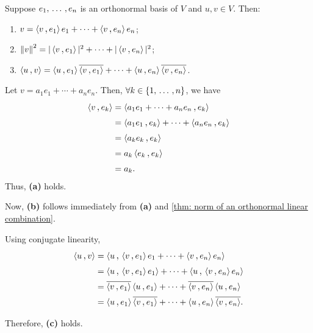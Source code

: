 \begin{thm}
  \label{thm: writing a vector as a linear combination of an orthonormal basis}

  Suppose $e_1, {\, \ldots \,\,}, e_n$ is an orthonormal basis of $V$ and $u,v \in V$. Then:
  \begin{enumerate}[label=\textbf{(\alph*)}]
    \item $v=\ip{v}{e_1}e_1 + \cdots + \ip{v}{e_n}e_n$;
    \item $\norm{v}^2 = |\ip{v}{e_1}|^2 + \cdots + |\ip{v}{e_n}|^2$;
    \item $\ip{u}{v} = \ip{u}{e_1} \overline{\ip{v}{e_1}} + \cdots + \ip{u}{e_n} \overline{\ip{v}{e_n}}$.
  \end{enumerate}
\end{thm}
\begin{prf}
  Let $v=a_1 e_1 + \cdots + a_n e_n$. Then, $\forall k \in \{1, {\, \ldots \,\,}, n\}$, we have
  \begin{equation}
    \begin{aligned}
      \ip{v}{e_k}
      &=\ip{a_1 e_1 + \cdots + a_n e_n}{e_k} \\
      &=\ip{a_1 e_1}{e_k} + \cdots + \ip{a_n e_n}{e_k}\\
      &=\ip{a_ke_k}{e_k} \\
      &= a_k\ip{e_k}{e_k} \\
      &=a_k.
    \end{aligned}
  \end{equation}
  Thus, \textbf{(a)} holds.

  Now, \textbf{(b)} follows immediately from \textbf{(a)} and \ref{thm: norm of an orthonormal linear combination}.

  Using conjugate linearity,
  \begin{equation}
    \begin{aligned}
      \ip{u}{v}
      &=\ip{u}{\ip{v}{e_1}e_1 + \cdots + \ip{v}{e_n}e_n} \\
      &= \ip{u}{\ip{v}{e_1}e_1} + \cdots + \ip{u}{\ip{v}{e_n}e_n} \\
      &= \overline{\ip{v}{e_1}}\ip{u}{e_1} + \cdots + \overline{\ip{v}{e_n}}\ip{u}{e_n} \\
      &= \ip{u}{e_1}\overline{\ip{v}{e_1}} + \cdots + \ip{u}{e_n}\overline{\ip{v}{e_n}}.
    \end{aligned}
  \end{equation}

  Therefore, \textbf{(c)} holds.
\end{prf}

